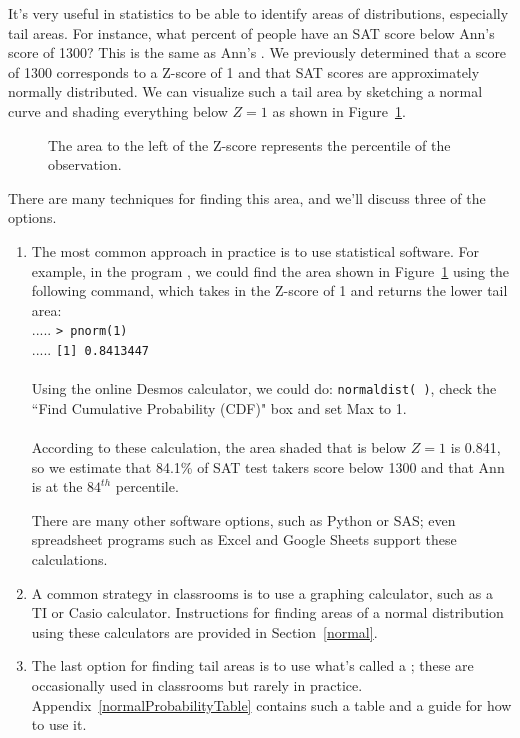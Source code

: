 It's very useful in statistics to be able to identify areas
of distributions, especially tail areas.
For instance, what percent of people have an SAT score below
Ann's score of 1300?
This is the same as Ann's .  We previously determined that a score of 1300 corresponds to a Z-score of 1 and that SAT scores are approximately normally distributed.  We can visualize such a tail area by sketching a normal curve and shading everything below $Z=1$ as shown in Figure~\ref{satBelow1300}.


\begin{figure}[h]
  \centering
  \caption{The area to the left of the Z-score represents the
      percentile of the observation.}
  \label{satBelow1300}
\end{figure}

There are many techniques for finding this area, and we'll discuss
three of the options.
\begin{enumerate}
\item
    The most common approach in practice is to use
    statistical software.
    For example, in the program \R{}, we could find the area
    shown in Figure~\ref{satBelow1300} using the
    following command, which takes in the Z-score of 1
    and returns the lower tail area: \\
    {\color{white}.....}%
        \texttt{> pnorm(1)} \\
    {\color{white}.....}%
        \texttt{[1] 0.8413447} \\
\\
   Using the online Desmos calculator, we could do:
        \texttt{normaldist( )}, check the ``Find Cumulative Probability (CDF)" box and set Max to 1.\\
\\
    According to these calculation,
    the area shaded that is below $Z = 1$
    is 0.841, so we estimate that 84.1\% of SAT test
    takers score below 1300 and that Ann is at the $84^{th}$ percentile.
   
 There are many other software options, such as Python or SAS; even spreadsheet programs such as
    Excel and Google Sheets support these calculations.
\item
    A common strategy in classrooms is to use a graphing
    calculator, such as a TI or Casio calculator.
   Instructions for finding areas of a normal distribution using these calculators are provided in Section~\ref{normal}. 
\item
    The last option for finding tail areas is to use
    what's called a ;
    these are occasionally used in classrooms
    but rarely in practice.
    Appendix~\ref{normalProbabilityTable}
    contains such a table and a guide for how to use it.
\end{enumerate}

